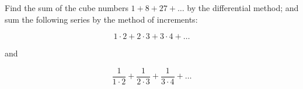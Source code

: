 Find the sum of the cube numbers $1 + 8 + 27 + \dots$
by the differential method; and sum the following series 
by the method of increments:

\[
1 \cdot 2 + 2 \cdot 3 + 3 \cdot 4 + \dots
\]

and

\[
\dfrac{1}{1 \cdot 2} + \dfrac{1}{2 \cdot 3} + \dfrac{1}{3 \cdot 4} + \dots
\]

